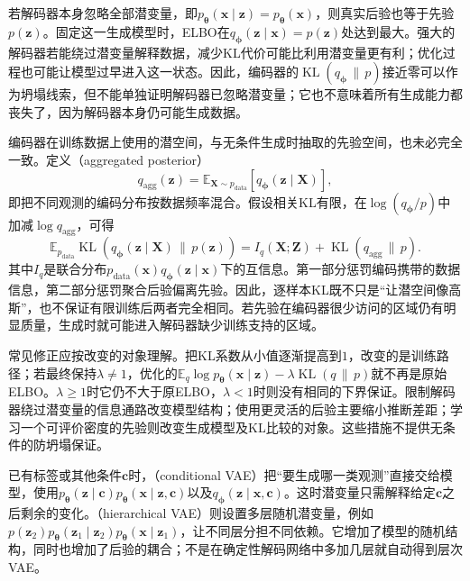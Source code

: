 若解码器本身忽略全部潜变量，即$p_{\bm{\theta}}(\bm{x}\mid\bm{z})=p_{\bm{\theta}}(\bm{x})$，则真实后验也等于先验$p(\bm{z})$。固定这一生成模型时，ELBO在$q_{\bm{\phi}}(\bm{z}\mid\bm{x})=p(\bm{z})$处达到最大。强大的解码器若能绕过潜变量解释数据，减少KL代价可能比利用潜变量更有利；优化过程也可能让模型过早进入这一状态。因此，编码器的$\operatorname{KL}(q_{\bm{\phi}}\,\|\,p)$接近零可以作为坍塌线索，但不能单独证明解码器已忽略潜变量；它也不意味着所有生成能力都丧失了，因为解码器本身仍可能生成数据。

编码器在训练数据上使用的潜空间，与无条件生成时抽取的先验空间，也未必完全一致。定义（aggregated posterior）
\begin{equation}
  \label{eq:pgm-generative-aggregated-posterior}
  q_{\mathrm{agg}}(\bm{z})
  =\mathbb{E}_{\bm{X}\sim p_{\mathrm{data}}}
       [q_{\bm{\phi}}(\bm{z}\mid\bm{X})],
\end{equation}
即把不同观测的编码分布按数据频率混合。假设相关KL有限，在$\log(q_{\bm{\phi}}/p)$中加减$\log q_{\mathrm{agg}}$，可得
\begin{equation}
  \label{eq:pgm-generative-kl-information}
  \mathbb{E}_{p_{\mathrm{data}}}
    \operatorname{KL}(q_{\bm{\phi}}(\bm{z}\mid\bm{X})\,\|\,p(\bm{z}))
  =I_q(\bm{X};\bm{Z})+
    \operatorname{KL}(q_{\mathrm{agg}}\,\|\,p).
\end{equation}
其中$I_q$是联合分布$p_{\mathrm{data}}(\bm{x})q_{\bm{\phi}}(\bm{z}\mid\bm{x})$下的互信息。第一部分惩罚编码携带的数据信息，第二部分惩罚聚合后验偏离先验。因此，逐样本KL既不只是“让潜空间像高斯”，也不保证有限训练后两者完全相同。若先验在编码器很少访问的区域仍有明显质量，生成时就可能进入解码器缺少训练支持的区域。

常见修正应按改变的对象理解。把KL系数从小值逐渐提高到$1$，改变的是训练路径；若最终保持$\lambda\ne1$，优化的$\mathbb{E}_q\log p_{\bm{\theta}}(\bm{x}\mid\bm{z})-\lambda \operatorname{KL}(q\,\|\,p)$就不再是原始ELBO。$\lambda\geq1$时它仍不大于原ELBO，$\lambda<1$时则没有相同的下界保证。限制解码器绕过潜变量的信息通路改变模型结构；使用更灵活的后验主要缩小推断差距；学习一个可评价密度的先验则改变生成模型及KL比较的对象。这些措施不提供无条件的防坍塌保证。

已有标签或其他条件$\bm{c}$时，（conditional VAE）把“要生成哪一类观测”直接交给模型，使用$p_{\bm{\theta}}(\bm{z}\mid\bm{c})p_{\bm{\theta}}(\bm{x}\mid\bm{z},\bm{c})$以及$q_{\bm{\phi}}(\bm{z}\mid\bm{x},\bm{c})$。这时潜变量只需解释给定$\bm{c}$之后剩余的变化。（hierarchical VAE）则设置多层随机潜变量，例如$p(\bm{z}_2)p_{\bm{\theta}}(\bm{z}_1\mid\bm{z}_2)p_{\bm{\theta}}(\bm{x}\mid\bm{z}_1)$，让不同层分担不同依赖。它增加了模型的随机结构，同时也增加了后验的耦合；不是在确定性解码网络中多加几层就自动得到层次VAE。

